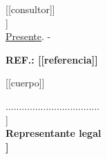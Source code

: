 \documentclass[letterpaper,12pt]{letter}
\begin{document}
\date{\today}
\begin{letter}{ [[consultor]] \\ [[cargo]] \\ \underline {Presente}. -}

\begin{center}
	\opening{\textbf{REF.: [[referencia]] }}
\end{center}

[[cuerpo]]

\vspace{2cm}

\begin{center}
...................................\\
[[representante_legal]]\\
{\bfseries Representante legal \\ [[grupo_empresa]]}
\end{center}

\end{letter}
\end{document}
